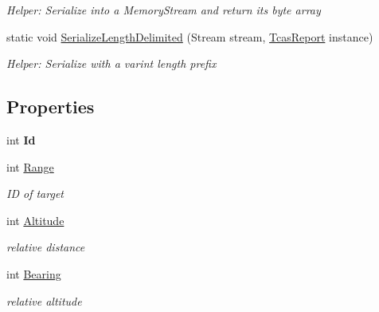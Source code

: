 \begin{DoxyCompactItemize}
\begin{DoxyCompactList}\small\item\em Helper\+: Serialize into a Memory\+Stream and return its byte array\end{DoxyCompactList}\item 
static void \hyperlink{class_example_1_1_tcas_report_a65c3a0268ceb68df8be04522cbadd029}{Serialize\+Length\+Delimited} (Stream stream, \hyperlink{class_example_1_1_tcas_report}{Tcas\+Report} instance)
\begin{DoxyCompactList}\small\item\em Helper\+: Serialize with a varint length prefix\end{DoxyCompactList}\end{DoxyCompactItemize}
\subsection*{Properties}
\begin{DoxyCompactItemize}
\item 
int {\bfseries Id}\hypertarget{class_example_1_1_tcas_report_abae87180b605bd602950494bb76e7f56}{}\label{class_example_1_1_tcas_report_abae87180b605bd602950494bb76e7f56}

\item 
int \hyperlink{class_example_1_1_tcas_report_a32691ce0bb3b627f44655cf3013f5f20}{Range}
\begin{DoxyCompactList}\small\item\em ID of target\end{DoxyCompactList}\item 
int \hyperlink{class_example_1_1_tcas_report_a88be13f8636f9e7902c325ec73a150f8}{Altitude}
\begin{DoxyCompactList}\small\item\em relative distance\end{DoxyCompactList}\item 
int \hyperlink{class_example_1_1_tcas_report_a12eb2351e84f8e2830223829fde681ad}{Bearing}
\begin{DoxyCompactList}\small\item\em relative altitude\end{DoxyCompactList}\end{DoxyCompactItemize}


